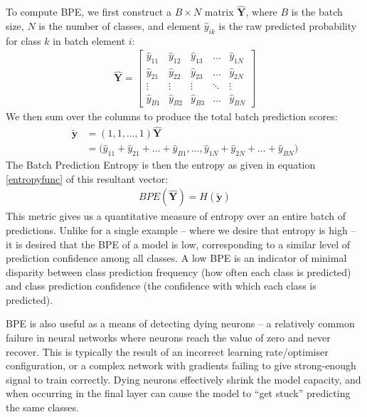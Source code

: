 \documentclass{report}
\begin{document}
To compute BPE, we first construct a $B{\times}N$ matrix $\bm{\hat{Y}}$, where $B$ is the batch size, $N$ is the number of classes, and element $\hat{y}_{ik}$ is the raw predicted probability for class $k$ in batch element $i$:
\begin{align} \label{eq:bpe:1}
\bm{\hat{Y}} = \begin{bmatrix}
\hat{y}_{11} & \hat{y}_{12} & \hat{y}_{13} & \dots  & \hat{y}_{1N} \\
\hat{y}_{21} & \hat{y}_{22} & \hat{y}_{23} & \dots  & \hat{y}_{2N} \\
\vdots & \vdots & \vdots & \ddots & \vdots \\
\hat{y}_{B1} & \hat{y}_{B2} & \hat{y}_{B3} & \dots  & \hat{y}_{BN}
\end{bmatrix}
\end{align}
We then sum over the columns to produce the total batch prediction scores:
\begin{align} \label{eq:bpe:2}
\bm{\tilde{y}} &= (1, 1, \dots, 1)\bm{\hat{Y}} \\
  &= \big(\hat{y}_{11} + \hat{y}_{21} + \dots + \hat{y}_{B1}, \dots, \hat{y}_{1N} + \hat{y}_{2N} + \dots + \hat{y}_{BN}\big)
\end{align}
The Batch Prediction Entropy is then the entropy as given in equation \ref{entropyfunc} of this resultant vector:
\begin{align}
BPE(\bm{\hat{Y}}) = H(\bm{\tilde{y}})
\end{align}
This metric gives us a quantitative measure of entropy over an entire batch of predictions. Unlike for a single example -- where we desire that entropy is high -- it is desired that the BPE of a model is low, corresponding to a similar level of prediction confidence among all classes. A low BPE is an indicator of minimal disparity between class prediction frequency (how often each class is predicted) and class prediction confidence (the confidence with which each class is predicted). \par
BPE is also useful as a means of detecting dying neurons -- a relatively common failure in neural networks where neurons reach the value of zero and never recover. This is typically the result of an incorrect learning rate/optimiser configuration, or a complex network with gradients failing to give strong-enough signal to train correctly. Dying neurons effectively shrink the model capacity, and when occurring in the final layer can cause the model to ``get stuck'' predicting the same classes. \par
\end{document}
